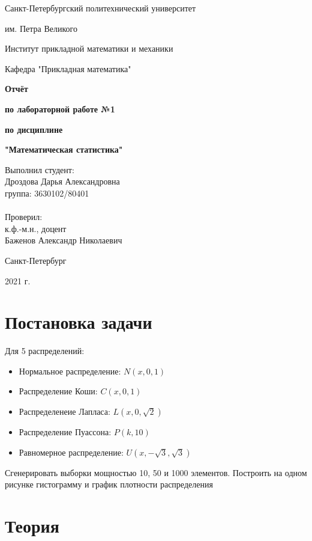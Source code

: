 \documentclass{article}
\begin{document}
\begin{titlepage}
  \thispagestyle{empty}
  \centerline {Санкт-Петербургский политехнический университет}
  \centerline { им. Петра Великого}
  \centerline { }
  \centerline {Институт прикладной математики и механики} 
  \centerline {Кафедра "Прикладная математика"}
  \vfill
  \centerline{\textbf{Отчёт}}
  \centerline{\textbf{по лабораторной работе №1}}
  \centerline{\textbf{по дисциплине}}
  \centerline{\textbf{"Математическая статистика"}}
  \vfill
  \hfill
  \begin{minipage}{0.45\textwidth}
  Выполнил студент:\\
  Дроздова Дарья Александровна\\
  группа: 3630102/80401 \\
  \\
  Проверил:\\
  к.ф.-м.н., доцент \\
  Баженов Александр Николаевич
  \end{minipage}
  \vfill
  \centerline {Санкт-Петербург}   
  \centerline {2021 г.}  
\end{titlepage}

\newpage
\setcounter{page}{2}
\tableofcontents

\newpage
\listoffigures

\newpage
\section{Постановка задачи}
  Для 5 распределений:
  \begin{itemize}
    \item Нормальное распределение: $N(x,0,1)$
    \item Распределение Коши: $C(x,0,1)$
    \item Распределенеие Лапласа: $L(x,0,\sqrt{2})$
    \item Распределение Пуассона: $P(k,10)$
    \item Равномерное распределение: $U(x,-\sqrt{3}, \sqrt{3})$
  \end{itemize}
  Сгенерировать выборки мощностью 10, 50 и 1000 элементов. Построить на одном рисунке гистограмму и график плотности распределения
  
\newpage
\section{Теория}
\end{document}

